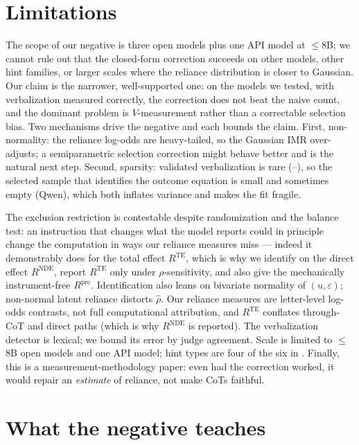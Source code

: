 \documentclass[10pt]{article}
\begin{document}
\section{Limitations}
\label{sec:limits}

The scope of our negative is three open models plus one API model at $\le$8B;
we cannot rule out that the closed-form correction succeeds on other models,
other hint families, or larger scales where the reliance distribution is closer
to Gaussian. Our claim is the narrower, well-supported one: on the models we
tested, with verbalization measured correctly, the correction does not beat the
naive count, and the dominant problem is $V$-measurement rather than a
correctable selection bias. Two mechanisms drive the negative and each bounds
the claim. First, non-normality: the reliance log-odds are heavy-tailed, so the
Gaussian IMR over-adjusts; a semiparametric selection correction might behave
better and is the natural next step. Second, sparsity: validated verbalization
is rare (\QQwJudgeRate--\QNeJudgeRate), so the selected sample that identifies
the outcome equation is small and sometimes empty (Qwen), which both inflates
variance and makes the fit fragile.

The exclusion restriction is contestable despite randomization and the
balance test: an instruction that changes what the model reports could in
principle change the computation in ways our reliance measures miss --- indeed
it demonstrably does for the total effect $R^{\mathrm{TE}}$, which is why we
identify on the direct effect $R^{\mathrm{NDE}}$, report $R^{\mathrm{TE}}$ only
under $\rho$-sensitivity, and also give the mechanically instrument-free
$R^{\mathrm{pre}}$.
Identification also leans on bivariate normality of $(u,\varepsilon)$;
non-normal latent reliance distorts $\hat\rho$. Our reliance measures are
letter-level log-odds contrasts, not full computational attribution, and
$R^{\mathrm{TE}}$ conflates through-CoT and direct paths (which is why
$R^{\mathrm{NDE}}$ is reported). The verbalization detector is lexical;
we bound its error by judge agreement. Scale is limited to $\le$8B open
models and one API model; hint types are four of the six in
\citet{chen2025reasoning}. Finally, this is a measurement-methodology
paper: even had the correction worked, it would repair an \emph{estimate} of
reliance, not make CoTs faithful.

\section{What the negative teaches}
\label{sec:takeaways}
\end{document}
